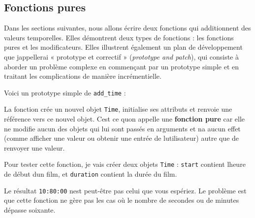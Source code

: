 \hypertarget{fonctions-pures}{%
\subsection{Fonctions pures}\label{fonctions-pures}}

Dans les sections suivantes, nous allons écrire deux fonctions qui
additionnent des valeurs temporelles. Elles démontrent deux types de
fonctions : les fonctions pures et les modificateurs. Elles illustrent
également un plan de développement que j\textquotesingle appellerai «
prototype et correctif » (\emph{prototype and patch}), qui consiste à
aborder un problème complexe en commençant par un prototype simple et en
traitant les complications de manière incrémentielle.

Voici un prototype simple de \texttt{add\_time} :

\begin{Shaded}
\begin{Highlighting}[]
     \OperatorTok{=}
    \OperatorTok{=}\OperatorTok{+}
    \OperatorTok{=}\OperatorTok{+}
    \OperatorTok{=}\OperatorTok{+}
     
\end{Highlighting}
\end{Shaded}

La fonction crée un nouvel objet \texttt{Time}, initialise ses attributs
et renvoie une référence vers ce nouvel objet. C\textquotesingle est ce
qu\textquotesingle on appelle une \textbf{fonction pure} car elle ne
modifie aucun des objets qui lui sont passés en arguments et
n\textquotesingle a aucun effet (comme afficher une valeur ou obtenir
une entrée de l\textquotesingle utilisateur) autre que de renvoyer une
valeur.

Pour tester cette fonction, je vais créer deux objets \texttt{Time} :
\texttt{start} contient l\textquotesingle heure de début
d\textquotesingle un film, et \texttt{duration} contient la durée du
film.

Le résultat \texttt{10:80:00} n\textquotesingle est peut-être pas celui
que vous espériez. Le problème est que cette fonction ne gère pas les
cas où le nombre de secondes ou de minutes dépasse soixante.

